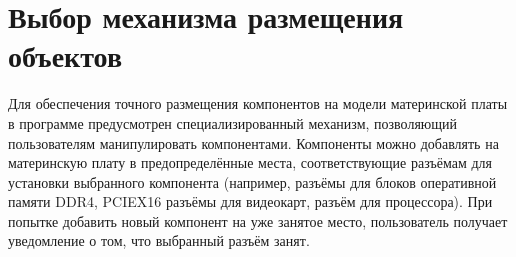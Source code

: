 \section{Выбор механизма размещения объектов}

Для обеспечения точного размещения компонентов на модели материнской платы в программе предусмотрен специализированный механизм, позволяющий пользователям манипулировать компонентами. Компоненты можно добавлять на материнскую плату в предопределённые места, соответствующие разъёмам для установки выбранного компонента (например, разъёмы для блоков оперативной памяти DDR4, PCIEX16 разъёмы для видеокарт, разъём для процессора). При попытке добавить новый компонент на уже занятое место, пользователь получает уведомление о том, что выбранный разъём занят.



